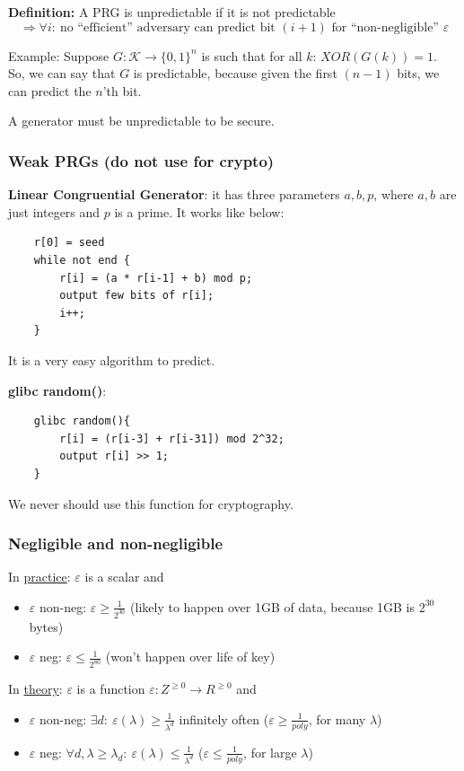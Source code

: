 \documentclass[12pt]{book}
\newcommand{\Def}{\textcolor{dkgreen}{\textbf{Definition:}} }
\begin{document}
\Def A PRG is unpredictable if it is not predictable $$\Rightarrow\forall i:\ \text{no ``efficient'' adversary can predict bit }(i+1)\text{ for ``non-negligible'' }\varepsilon$$

Example: Suppose $G:\mathcal{K}\longrightarrow\{0,1\}^{n}$ is such that for all $k$: $XOR(G(k))=1$.\\So, we can say that $G$ is predictable, because given the first $(n-1)$ bits, we can predict the $n$'th bit.

A generator must be unpredictable to be secure.

\subsubsection{Weak PRGs (do not use for crypto)}
\textbf{Linear Congruential Generator}: it has three parameters $a,b,p$, where $a,b$ are just integers and $p$ is a prime. It works like below:

\begin{verbatim}
	r[0] = seed
	while not end {
		r[i] = (a * r[i-1] + b) mod p;
		output few bits of r[i];
		i++;
	}
\end{verbatim}It is a very easy algorithm to predict.

\textbf{glibc random()}:
\begin{verbatim}
	glibc random(){
		r[i] = (r[i-3] + r[i-31]) mod 2^32;
		output r[i] >> 1;
	}
\end{verbatim}
We never should use this function for cryptography.

\subsubsection{Negligible and non-negligible}
In \underline{practice}: $\varepsilon$ is a scalar and
\begin{itemize}
	\item $\varepsilon$ non-neg: $\varepsilon\geq\frac{1}{2^{30}}$ (likely to happen over 1GB of data, because 1GB is $2^{30}$ bytes)
	\item $\varepsilon$ neg: $\varepsilon\leq\frac{1}{2^{80}}$ (won't happen over life of key)
\end{itemize}

In \underline{theory}: $\varepsilon$ is a function $\varepsilon:Z^{\geq 0}\longrightarrow R^{\geq 0}$ and
\begin{itemize}
	\item $\varepsilon$ non-neg: $\exists d:\ \varepsilon(\lambda)\geq \frac{1}{\lambda^{d}}$ infinitely often ($\varepsilon\geq\frac{1}{poly}$, for many $\lambda$)
	\item $\varepsilon$ neg: $\forall d,\lambda\geq\lambda_{d}:\ \varepsilon(\lambda)\leq \frac{1}{\lambda^{d}}$ ($\varepsilon\leq\frac{1}{poly}$, for large $\lambda$)
\end{itemize}
\end{document}
